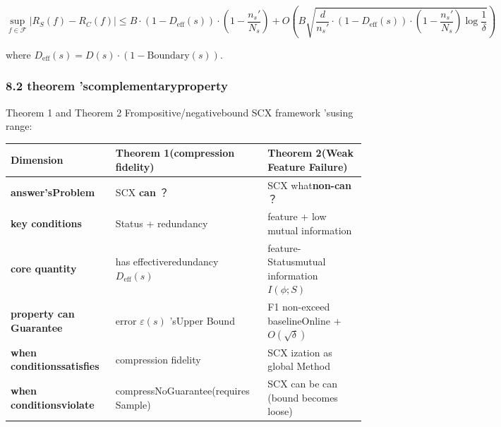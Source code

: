 \documentclass[
  12pt,
]{article}
\begin{document}
\[\sup_{f \in \mathcal{F}} |R_S(f) - R_C(f)| \leq B \cdot (1 - D_{\text{eff}}(s)) \cdot \left(1 - \frac{n_s'}{N_s}\right) + O\left(B\sqrt{\frac{d}{n_s'} \cdot (1 - D_{\text{eff}}(s)) \cdot \left(1 - \frac{n_s'}{N_s}\right) \log\frac{1}{\delta}}\right)\]

where \(D_{\text{eff}}(s) = D(s) \cdot (1 - \text{Boundary}(s))\). 

\subsubsection{8.2
theorem 'scomplementaryproperty }\label{ux4e24ux4e2aux5b9aux7406ux7684ux4e92ux8865ux6027}

Theorem 1 and  Theorem 2 Frompositive/negativebound  SCX framework 'susing range: 

\begin{longtable}[]{@{}
  >{\raggedright\arraybackslash}p{}
  >{\raggedright\arraybackslash}p{}
  >{\raggedright\arraybackslash}p{}@{}}
\toprule\noalign{}
\begin{minipage}[b]{\linewidth}\raggedright
Dimension
\end{minipage} & \begin{minipage}[b]{\linewidth}\raggedright
Theorem 1(compression fidelity)
\end{minipage} & \begin{minipage}[b]{\linewidth}\raggedright
Theorem 2(Weak Feature Failure)
\end{minipage} \\
\midrule\noalign{}
\endhead
\bottomrule\noalign{}
\endlastfoot
\textbf{answer'sProblem} & SCX \textbf{can }？ & SCX
what\textbf{non-can }？ \\
\textbf{key conditions} & Status + redundancy & feature + low mutual information \\
\textbf{core quantity } & has effectiveredundancy \(D_{\text{eff}}(s)\) & feature-Statusmutual information
\(I(\phi; S)\) \\
\textbf{property can Guarantee} & error  \(\varepsilon(s)\) 'sUpper Bound & F1 non-exceed baselineOnline  +
\(O(\sqrt{\delta})\) \\
\textbf{when conditionssatisfies } & compression fidelity & SCX ization as global Method \\
\textbf{when conditionsviolate} & compressNoGuarantee(requires Sample) & SCX
can be can (bound becomes loose) \\
\end{longtable}
\end{document}
